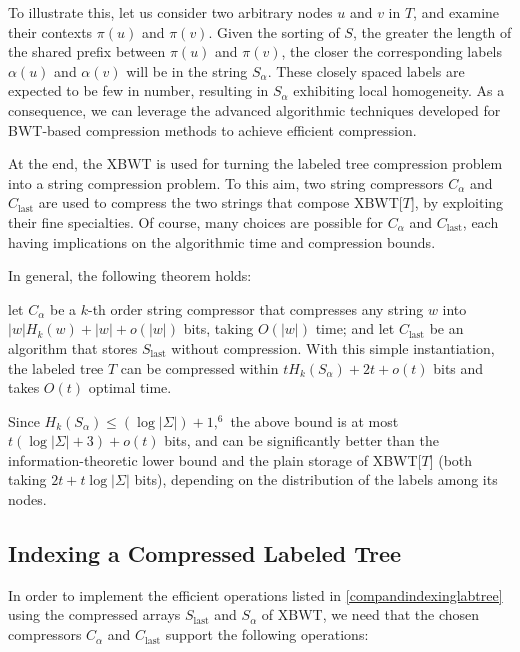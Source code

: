 To illustrate this, let us consider two arbitrary nodes $u$ and $v$ in $T$, and examine their contexts $\pi(u)$ and $\pi(v)$. Given the sorting of $S$, the greater the length of the shared prefix between $\pi(u)$ and $\pi(v)$, the closer the corresponding labels $\alpha(u)$ and $\alpha(v)$ will be in the string $S_{\alpha}$. These closely spaced labels are expected to be few in number, resulting in $S_{\alpha}$ exhibiting local homogeneity. As a consequence, we can leverage the advanced algorithmic techniques developed for BWT-based compression methods to achieve efficient compression.

At the end, the XBWT is used for turning the labeled tree compression problem into a string compression problem. To this aim, two string compressors
$C_{\alpha}$ and $C_{\text{last}}$ are used to compress the two strings that compose XBWT[$T$], by exploiting their fine specialties. Of course, many choices are possible for $C_{\alpha}$ and $C_{\text{last}}$, each having implications on the algorithmic time and compression bounds.

In general, the following theorem holds:

\begin{theorem}
    let $C_{\alpha}$ be a $k$-th order string compressor that compresses any string $w$ into $|w|H_k(w) + |w| + o(|w|)$ bits, taking $O(|w|)$ time; and let $C_{\text{last}}$ be an algorithm that stores $S_{\text{last}}$ without compression. With this simple instantiation, the labeled tree $T$ can be compressed within $t H_k(S_{\alpha}) + 2t + o(t)$ bits and takes $O(t)$ optimal time.
\end{theorem}

Since $H_k(S_\alpha) \leq (\log |\Sigma|) + 1,^6$ the above bound is at most $t(\log |\Sigma| + 3) + o(t)$ bits, and can be significantly better than the information-theoretic lower bound and the plain storage of XBWT[$T$] (both taking $2t + t \log|\Sigma|$ bits), depending on the distribution of the labels among its nodes.

\subsection{Indexing a Compressed Labeled Tree} \label{sec:xbwt_operations}
In order to implement the efficient operations listed in \cref{compandindexinglabtree} using the compressed arrays $S_{\text{last}}$ and $S_{\alpha}$ of XBWT, we need that the chosen compressors $C_{\alpha}$ and $C_{\text{last}}$ support the following operations:

